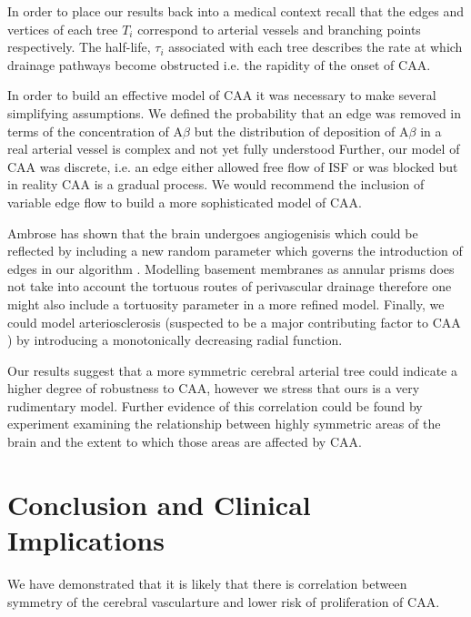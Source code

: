 \documentclass[10pt]{amsart} %
\theoremstyle{definition}
\begin{document}
In order to place our results back into a medical context recall that the edges and vertices of each tree $T_i$ correspond to arterial vessels and branching points respectively.  The half-life, $\tau_i$ associated with each tree describes the rate at which drainage pathways become obstructed i.e. the rapidity of the onset of CAA.  

In order to build an effective model of CAA it was necessary to make several simplifying assumptions.  We defined the probability that an edge was removed in terms of the concentration of A$\beta$ but the distribution of deposition of A$\beta$ in a real arterial vessel is complex and not yet fully understood %
Further, our model of CAA was discrete, i.e. an edge either allowed free flow of ISF or was blocked but in reality CAA is a gradual process.  We would recommend the inclusion of variable edge flow to build a more sophisticated model of CAA. 

Ambrose has shown that the brain undergoes angiogenisis which could be reflected by including a new random parameter which governs the introduction of edges in our algorithm \cite{ambrose}.   Modelling basement membranes as annular prisms does not take into account the tortuous routes of perivascular drainage therefore one might also include a tortuosity parameter in a more refined model.  Finally, we could model arteriosclerosis (suspected to be a major contributing factor to CAA \cite{wellerperi})  by 
introducing a monotonically decreasing radial function. 

Our results suggest that a more symmetric cerebral arterial tree could indicate a higher degree of robustness to CAA, however we stress that ours is a very rudimentary model.  Further evidence of this correlation could be found by experiment examining the relationship between highly symmetric areas of the brain and the extent to which those areas are affected by CAA. 

\section{Conclusion and Clinical Implications}

We have demonstrated that it is likely that there is correlation between symmetry of the cerebral vascularture and lower risk of proliferation of CAA.  




{}
\end{document}
